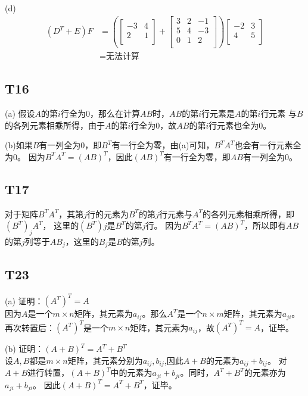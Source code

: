 \documentclass{article}
\begin{document}
(d)
\begin{align*}
    (D^T+E)F &=
    \left(
        \begin{bmatrix}
            -3 & 4\\
            2 & 1\\
        \end{bmatrix}
        +
        \begin{bmatrix}
            3 & 2 & -1\\
            5 & 4 & -3\\
            0 & 1 & 2\\
        \end{bmatrix}
    \right)
    \begin{bmatrix}
        -2 & 3\\
        4 & 5\\
    \end{bmatrix}\\
    &= \text{无法计算}
\end{align*}

\subsection{T16}
(a) 假设$A$的第$i$行全为0，那么在计算$AB$时，$AB$的第$i$行元素是$A$的第$i$行元素
与$B$的各列元素相乘所得，由于$A$的第$i$行全为0，故$AB$的第$i$行元素也全为0。

(b)如果$B$有一列全为0，即$B^T$有一行全为零，由(a)可知，$B^TA^T$也会有一行元素全为0。
因为$B^TA^T = (AB)^T$，因此$(AB)^T$有一行全为零，即$AB$有一列全为0。

\subsection{T17}
对于矩阵$B^TA^T$，其第$j$行的元素为$B^T$的第$j$行元素与$A^T$的各列元素相乘所得，即$(B^T)_jA^T$，
这里的$(B^T)j$是$B^T$的第$j$行。
因为$B^TA^T = (AB)^T$，所以即有$AB$的第$j$列等于$AB_j$，这里的$B_j$是$B$的第$j$列。

\subsection{T23}
(a) 证明：$(A^T)^T = A$\\
因为$A$是一个$m\times n$矩阵，其元素为$a_{ij}$。那么$A^T$是一个$n \times m$矩阵，其元素为$a_{ji}$。
再次转置后：$(A^T)^T$是一个$m \times n$矩阵，其元素为$a_{ij}$，故$(A^T)^T = A$，证毕。

(b) 证明：$(A + B)^T = A^T + B^T$\\
设$A,B$都是$m \times n$矩阵，其元素分别为$a_{ij}, b_{ij}$,因此$A + B$的元素为$a_{ij} + b_{ij}$。
对$A+B$进行转置，$(A+B)^T$中的元素为$a_{ji} + b_{ji}$。同时，$A^T + B^T$的元素亦为$a_{ji} + b_{ji}$。
因此$(A + B)^T = A^T + B^T$，证毕。
\end{document}
